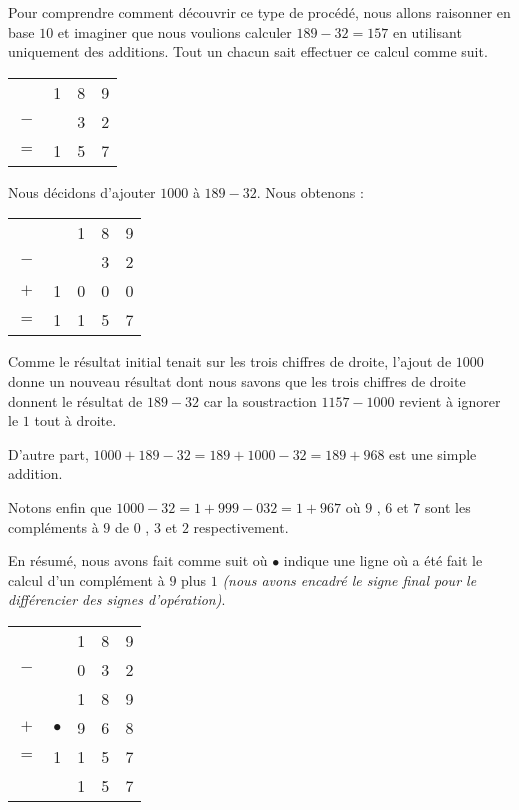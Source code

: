 Pour comprendre comment découvrir ce type de procédé, nous allons raisonner en base $10$ et imaginer que nous voulions calculer $189 - 32 = 157$ en utilisant uniquement des additions. Tout un chacun sait effectuer ce calcul comme suit.
\begin{center}
\begin{tabular}{cccc}
	    & 1 & 8 & 9 \\
	$-$ &   & 3 & 2 \\
	\hline
    $=$ & 1 & 5 & 7 \\
\end{tabular}
\end{center}
Nous décidons d'ajouter $1000$ à $189 - 32$. Nous obtenons :
\begin{center}
\begin{tabular}{ccccc}
	    &   & 1 & 8 & 9 \\
	$-$ &   &   & 3 & 2 \\
	$+$ & 1 & 0 & 0 & 0 \\
	\hline
    $=$ & 1 & 1 & 5 & 7 \\
\end{tabular}
\end{center}
Comme le résultat initial tenait sur les trois chiffres de droite, l'ajout de $1000$ donne un nouveau résultat dont nous savons que les trois chiffres de droite donnent le résultat de $189 - 32$ car la soustraction $1157 - 1000$ revient à ignorer le $1$ tout à droite.

\smallskip

D'autre part, $1000 + 189 - 32 = 189 + 1000 - 32 = 189 + 968$ est une simple addition.

\smallskip

Notons enfin que $1000 - 32 = 1 + 999 - 032 = 1 + 967$ où $9$ , $6$ et $7$ sont les compléments à $9$ de $0$ , $3$ et $2$ respectivement.

\smallskip

En résumé, nous avons fait comme suit où $\bullet$ indique une ligne où a été fait le calcul d'un complément à $9$ plus $1$ \emph{(nous avons encadré le signe final pour le différencier des signes d'opération)}.

\begin{center}
\begin{tabular}{ccccc}
	    &           & 1 & 8 & 9 \\
	$-$ &           & 0 & 3 & 2 \\
	\hline
	\hline
	    &           & 1 & 8 & 9 \\
	$+$ & $\bullet$ & 9 & 6 & 8 \\
	\hline
    $=$ & 1         & 1 & 5 & 7 \\
	\hline
	\hline
        & \sign{+}  & 1 & 5 & 7 \\
\end{tabular}
\end{center}

